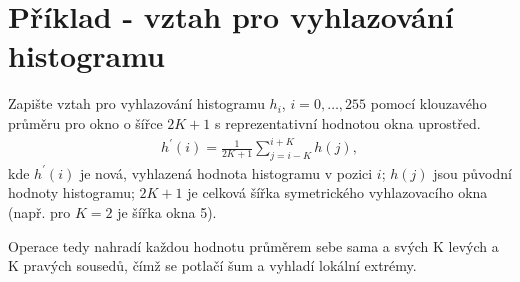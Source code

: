 \section{Příklad - vztah pro vyhlazování histogramu}
Zapište vztah pro vyhlazování histogramu $h_i$, $i=0,\dots,255$ pomocí klouzavého průměru pro okno o šířce $2K+1$ s 
reprezentativní hodnotou okna uprostřed.
\begin{align}
    h^\prime (i) = \frac{1}{2K+1}\sum_{j=i-K}^{i+K}h(j),
\end{align}
kde $h^\prime(i)$ je nová, vyhlazená hodnota histogramu v pozici $i$; $h(j)$ jsou původní hodnoty histogramu;
$2K+1$ je celková šířka symetrického vyhlazovacího okna (např. pro $K=2$ je šířka okna 5).

Operace tedy nahradí každou hodnotu průměrem sebe sama a svých K levých a K pravých sousedů, čímž se potlačí šum a 
vyhladí lokální extrémy.